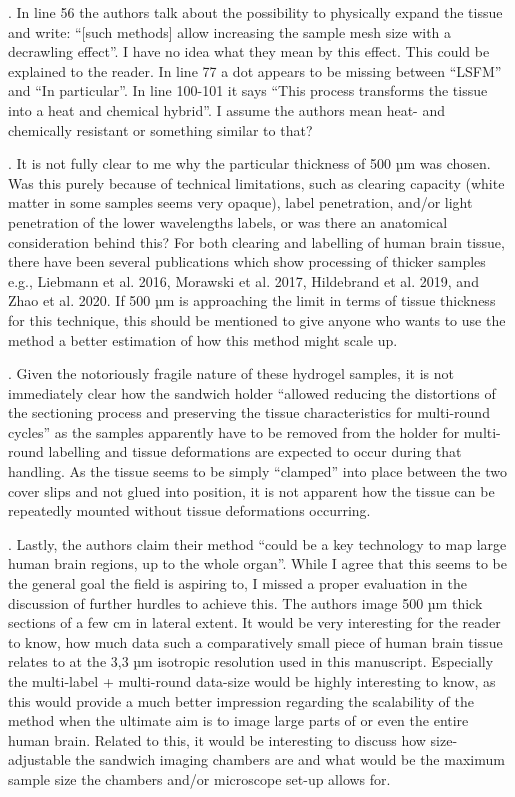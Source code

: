 \documentclass{article}
\begin{document}
. In line 56 the authors talk about the possibility to physically expand the tissue and write: “[such methods] allow increasing the sample mesh size with a decrawling effect”. I have no idea what they mean by this effect. This could be explained to the reader. In line 77 a dot appears to be missing between “LSFM” and “In particular”. In line 100-101 it says “This process transforms the tissue into a heat and chemical hybrid”. I assume the authors mean heat- and chemically resistant or something similar to that?

. It is not fully clear to me why the particular thickness of 500 µm was chosen. Was this purely because of technical limitations, such as clearing capacity (white matter in some samples seems very opaque), label penetration, and/or light penetration of the lower wavelengths labels, or was there an anatomical consideration behind this? For both clearing and labelling of human brain tissue, there have been several publications which show processing of thicker samples e.g., Liebmann et al. 2016, Morawski et al. 2017, Hildebrand et al. 2019, and Zhao et al. 2020. If 500 µm is approaching the limit in terms of tissue thickness for this technique, this should be mentioned to give anyone who wants to use the method a better estimation of how this method might scale up.

. Given the notoriously fragile nature of these hydrogel samples, it is not immediately clear how the sandwich holder “allowed reducing the distortions of the sectioning process and preserving the tissue characteristics for multi-round cycles” as the samples apparently have to be removed from the holder for multi-round labelling and tissue deformations are expected to occur during that handling. As the tissue seems to be simply “clamped” into place between the two cover slips and not glued into position, it is not apparent how the tissue can be repeatedly mounted without tissue deformations occurring.

. Lastly, the authors claim their method “could be a key technology to map large human brain regions, up to the whole organ”. While I agree that this seems to be the general goal the field is aspiring to, I missed a proper evaluation in the discussion of further hurdles to achieve this. The authors image 500 µm thick sections of a few cm in lateral extent. It would be very interesting for the reader to know, how much data such a comparatively small piece of human brain tissue relates to at the 3,3 µm isotropic resolution used in this manuscript. Especially the multi-label + multi-round data-size would be highly interesting to know, as this would provide a much better impression regarding the scalability of the method when the ultimate aim is to image large parts of or even the entire human brain. Related to this, it would be interesting to discuss how size-adjustable the sandwich imaging chambers are and what would be the maximum sample size the chambers and/or microscope set-up allows for.
\end{document}
